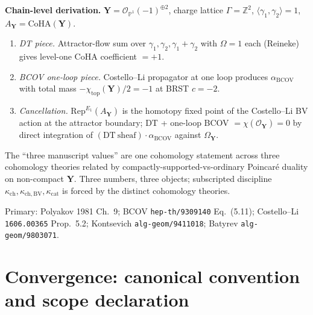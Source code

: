 \documentclass[11pt]{amsart}
\theoremstyle{definition}
\providecommand{\CoHA}{\mathrm{CoHA}}
\providecommand{\bY}{\mathbf{Y}}
\providecommand{\cO}{\mathcal{O}}
\providecommand{\bZ}{\mathbb{Z}}
\providecommand{\bP}{\mathbb{P}}
\providecommand{\Rep}{\mathrm{Rep}}
\begin{document}
\textbf{Chain-level derivation.}
$\bY = \cO_{\bP^1}(-1)^{\oplus 2}$, charge lattice
$\Gamma = \bZ^2$, $\langle \gamma_1, \gamma_2 \rangle = 1$,
$A_\bY = \CoHA(\bY)$.
\begin{enumerate}[label=\emph{(\roman*)}, leftmargin=2em]
\item \emph{DT piece.} Attractor-flow sum over
  $\gamma_1, \gamma_2, \gamma_1 + \gamma_2$ with $\Omega = 1$ each
  (Reineke) gives level-one CoHA coefficient $= +1$.
\item \emph{BCOV one-loop piece.} Costello--Li propagator at one
  loop produces $\alpha_{\mathrm{BCOV}}$ with total mass
  $-\chi_{\mathrm{top}}(\bY)/2 = -1$ at BRST $c = -2$.
\item \emph{Cancellation.} $\Rep^{E_1}(A_\bY)$ is the homotopy
  fixed point of the Costello--Li BV action at the attractor
  boundary; DT + one-loop BCOV $= \chi(\cO_\bY) = 0$ by direct
  integration of $(\mathrm{DT~sheaf}) \cdot \alpha_{\mathrm{BCOV}}$
  against $\Omega_\bY$.
\end{enumerate}

The ``three manuscript values'' are one cohomology statement across
three cohomology theories related by
compactly-supported-vs-ordinary Poincaré duality on non-compact
$\bY$. Three numbers, three objects; subscripted discipline
$\kappa_{\mathrm{ch}}, \kappa_{\mathrm{ch,BV}}, \kappa_{\mathrm{cat}}$
is forced by the distinct cohomology theories.

Primary: Polyakov 1981 Ch.~9;
BCOV \texttt{hep-th/9309140} Eq.~(5.11);
Costello--Li \texttt{1606.00365} Prop.~5.2;
Kontsevich \texttt{alg-geom/9411018};
Batyrev \texttt{alg-geom/9803071}.

\section*{Convergence: canonical convention and scope declaration}
\end{document}
